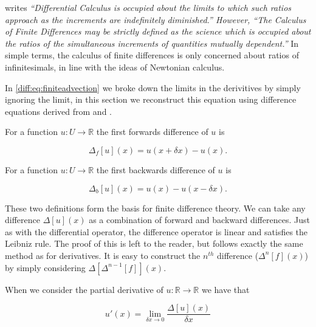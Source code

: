 \documentclass[../main.tex]{subfiles}
\begin{document}
  \cite{boole1880} writes \emph{``Differential Calculus is occupied about the limits to which such ratios approach as the increments are indefinitely diminished.'' However, ``The Calculus of Finite Differences may be strictly defined as the science which is occupied about the ratios of the simultaneous increments of quantities mutually dependent.''} In simple terms, the calculus of finite differences is only concerned about ratios of infinitesimals, in line with the ideas of Newtonian calculus.

  In \autoref{diff:eq:finiteadvection} we broke down the limits in the derivitives by simply ignoring the limit, in this section we reconstruct this equation using difference equations derived from \cite{boole1880} and \cite{hildebrand1987}.

  \begin{definition}
    For a function $u: U \to \mathbb{R}$ the first forwards difference of $u$ is

    \begin{equation}
      \Delta_f[u](x) = u(x + \delta x) - u(x).
    \end{equation}
  \end{definition}

  \begin{definition}
    For a function $u: U \to \mathbb{R}$ the first backwards difference of $u$ is

    \begin{equation}
      \Delta_b[u](x) = u(x) - u(x - \delta x).
    \end{equation}
  \end{definition}

  These two definitions form the basis for finite difference theory. We can take any difference $\Delta[u](x)$ as a combination of forward and backward differences. Just as with the differential operator, the difference operator is linear and satisfies the Leibniz rule. The proof of this is left to the reader, but follows exactly the same method as for derivatives. It is easy to construct the $n^{th}$ difference ($\Delta ^n[f](x)$) by simply considering $\Delta [\Delta ^{n-1}[f]](x)$.

  When we consider the partial derivative of $u: \mathbb{R} \to \mathbb{R}$ we have that

  \begin{equation}
    u'(x) = \lim_{\delta x \to 0} \frac{\Delta[u](x)}{\delta x}
  \end{equation}
\end{document}
